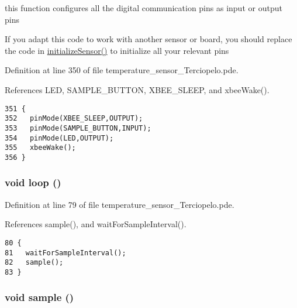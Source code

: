 this function configures all the digital communication pins as input or output pins 

If you adapt this code to work with another sensor or board, you should replace the code in \hyperlink{applet_2temperature__sensor__board__v2_8h_f6c9587ccbcf223f8c79f508c2fef366}{initializeSensor()} to initialize all your relevant pins 

Definition at line 350 of file temperature\_\-sensor\_\-Terciopelo.pde.

References LED, SAMPLE\_\-BUTTON, XBEE\_\-SLEEP, and xbeeWake().

\begin{Code}\begin{verbatim}351 {
352   pinMode(XBEE_SLEEP,OUTPUT);
353   pinMode(SAMPLE_BUTTON,INPUT);
354   pinMode(LED,OUTPUT);
355   xbeeWake();
356 }  
\end{verbatim}
\end{Code}


\hypertarget{applet_2temperature__sensor___terciopelo_8pde_fe461d27b9c48d5921c00d521181f12f}{
\subsubsection[{loop}]{\setlength{\rightskip}{0pt plus 5cm}void loop ()}}
\label{applet_2temperature__sensor___terciopelo_8pde_fe461d27b9c48d5921c00d521181f12f}




Definition at line 79 of file temperature\_\-sensor\_\-Terciopelo.pde.

References sample(), and waitForSampleInterval().

\begin{Code}\begin{verbatim}80 {
81   waitForSampleInterval();
82   sample();
83 }
\end{verbatim}
\end{Code}


\hypertarget{applet_2temperature__sensor___terciopelo_8pde_50a2ce599e896bfb535e70a42003ed23}{
\subsubsection[{sample}]{\setlength{\rightskip}{0pt plus 5cm}void sample ()}}
\label{applet_2temperature__sensor___terciopelo_8pde_50a2ce599e896bfb535e70a42003ed23}




